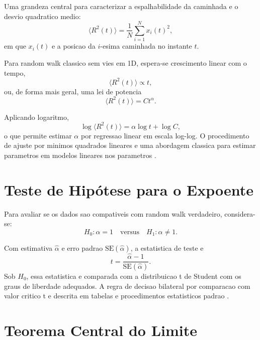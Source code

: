 Uma grandeza central para caracterizar a espalhabilidade da caminhada e o desvio quadratico medio:
\begin{equation}
\langle R^2(t) \rangle = \frac{1}{N}\sum_{i=1}^{N} x_i(t)^2,
\end{equation}
em que $x_i(t)$ e a posicao da $i$-esima caminhada no instante $t$.

Para random walk classico sem vies em 1D, espera-se crescimento linear com o tempo,
\begin{equation}
\langle R^2(t) \rangle \propto t,
\end{equation}
ou, de forma mais geral, uma lei de potencia
\begin{equation}
\langle R^2(t) \rangle = C t^{\alpha}.
\end{equation}

Aplicando logaritmo,
\begin{equation}
\log\langle R^2(t) \rangle = \alpha\log t + \log C,
\end{equation}
o que permite estimar $\alpha$ por regressao linear em escala log-log.
O procedimento de ajuste por minimos quadrados lineares e uma abordagem classica para estimar parametros em modelos lineares nos parametros \cite{nist_linear_least_squares}.

\section{Teste de Hipótese para o Expoente}

Para avaliar se os dados sao compativeis com random walk verdadeiro, considera-se:
\begin{equation}
H_0: \alpha = 1
\quad \text{versus} \quad
H_1: \alpha \ne 1.
\end{equation}

Com estimativa $\hat{\alpha}$ e erro padrao $\text{SE}(\hat{\alpha})$, a estatistica de teste e
\begin{equation}
t = \frac{\hat{\alpha}-1}{\text{SE}(\hat{\alpha})}.
\end{equation}
Sob $H_0$, essa estatistica e comparada com a distribuicao t de Student com os graus de liberdade adequados.
A regra de decisao bilateral por comparacao com valor critico t e descrita em tabelas e procedimentos estatisticos padrao \cite{nist_t_critical_values}.

\section{Teorema Central do Limite}

